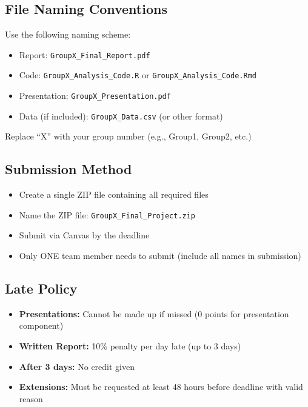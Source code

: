 \documentclass[11pt]{article}
\begin{document}
\subsection{File Naming Conventions}

Use the following naming scheme:

\begin{itemize}
\item Report: \texttt{GroupX\_Final\_Report.pdf}
\item Code: \texttt{GroupX\_Analysis\_Code.R} or \texttt{GroupX\_Analysis\_Code.Rmd}
\item Presentation: \texttt{GroupX\_Presentation.pdf}
\item Data (if included): \texttt{GroupX\_Data.csv} (or other format)
\end{itemize}

Replace ``X'' with your group number (e.g., Group1, Group2, etc.)

\subsection{Submission Method}

\begin{itemize}
\item Create a single ZIP file containing all required files
\item Name the ZIP file: \texttt{GroupX\_Final\_Project.zip}
\item Submit via Canvas by the deadline
\item Only ONE team member needs to submit (include all names in submission)
\end{itemize}

\subsection{Late Policy}

\begin{itemize}
\item \textbf{Presentations:} Cannot be made up if missed (0 points for presentation component)
\item \textbf{Written Report:} 10\% penalty per day late (up to 3 days)
\item \textbf{After 3 days:} No credit given
\item \textbf{Extensions:} Must be requested at least 48 hours before deadline with valid reason
\end{itemize}
\end{document}
